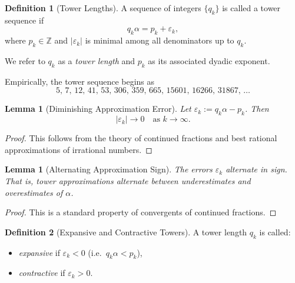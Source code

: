 \documentclass[12pt, oneside]{article}
\numberwithin{equation}{section}
\theoremstyle{definition}
\newtheorem{definition}{Definition}[section]
\theoremstyle{plain}
\newtheorem{lemma}[theorem]{Lemma}
\theoremstyle{remark}
\begin{document}
\begin{definition}[Tower Lengths]
A sequence of integers $\{q_k\}$ is called a tower sequence if
\[
q_k \alpha = p_k + \varepsilon_k,
\]
where $p_k \in \mathbb{Z}$ and $|\varepsilon_k|$ is minimal among all
denominators up to $q_k$.

We refer to $q_k$ as a \emph{tower length} and $p_k$ as its associated
dyadic exponent.
\end{definition}

Empirically, the tower sequence begins as
\[
5,\,7,\,12,\,41,\,53,\,306,\,359,\,665,\,15601,\,16266,\,31867,\,\dots
\]


\begin{lemma}[Diminishing Approximation Error]
\label{lem:tower-error}
Let $\varepsilon_k := q_k \alpha - p_k$.
Then
\[
|\varepsilon_k| \to 0 \quad \text{as } k \to \infty.
\]
\end{lemma}

\begin{proof}
This follows from the theory of continued fractions and best rational
approximations of irrational numbers.
\end{proof}


\begin{lemma}[Alternating Approximation Sign]
\label{lem:alternating}
The errors $\varepsilon_k$ alternate in sign.  That is,
tower approximations alternate between underestimates and overestimates
of $\alpha$.
\end{lemma}

\begin{proof}
This is a standard property of convergents of continued fractions.
\end{proof}


\begin{definition}[Expansive and Contractive Towers]
A tower length $q_k$ is called:
\begin{itemize}
\item \emph{expansive} if $\varepsilon_k < 0$ (i.e.\ $q_k\alpha < p_k$),
\item \emph{contractive} if $\varepsilon_k > 0$.
\end{itemize}
\end{definition}
\end{document}
